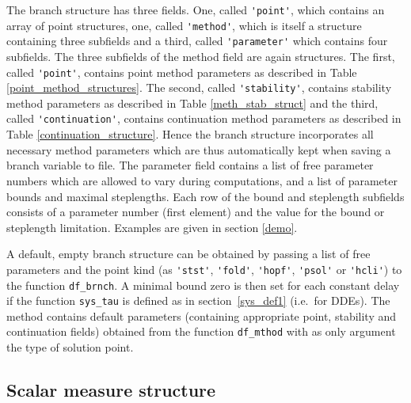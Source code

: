 \documentclass[10pt]{scrartcl}
\newcommand{\blist}[1]{\mbox{\lstinline!#1!}}
\begin{document}
The branch structure has three fields. One, called \blist{'point'},
which contains an array of point structures, one, called \blist{'method'},
which is itself a structure containing three subfields and a third,
called \blist{'parameter'} which contains four subfields.  The three subfields
of the method field are again structures. The first, called \blist{'point'},
contains point method parameters as described in Table
\ref{point_method_structures}.  The second, called \blist{'stability'},
contains stability method parameters as described in Table
\ref{meth_stab_struct} and the third, called \blist{'continuation'}, contains
continuation method parameters as described in Table
\ref{continuation_structure}.  Hence the branch structure incorporates
all necessary method parameters which are thus automatically kept when
saving a branch variable to file.  The parameter field contains a list
of free parameter numbers which are allowed to vary during
computations, and a list of parameter bounds and maximal
steplengths. Each row of the bound and steplength subfields consists
of a parameter number (first element) and the value for the bound or
steplength limitation. Examples are given in section \ref{demo}.

A default, empty branch structure can be obtained by passing
a list of free parameters and the point kind 
(as \blist{'stst'}, \blist{'fold'}, \blist{'hopf'}, \blist{'psol'}
or \blist{'hcli'})
to the function \blist{df_brnch}. A minimal bound zero is then set
for each constant delay if the function \blist{sys_tau} is defined
as in section~\ref{sys_def1} (i.e.~for DDEs). The method contains 
default parameters
(containing appropriate point, stability and continuation fields)
obtained from the function \blist{df_mthod} with as only argument the type
of solution point.


\subsection{Scalar measure structure}\label{sec:meas:struct}
\end{document}
